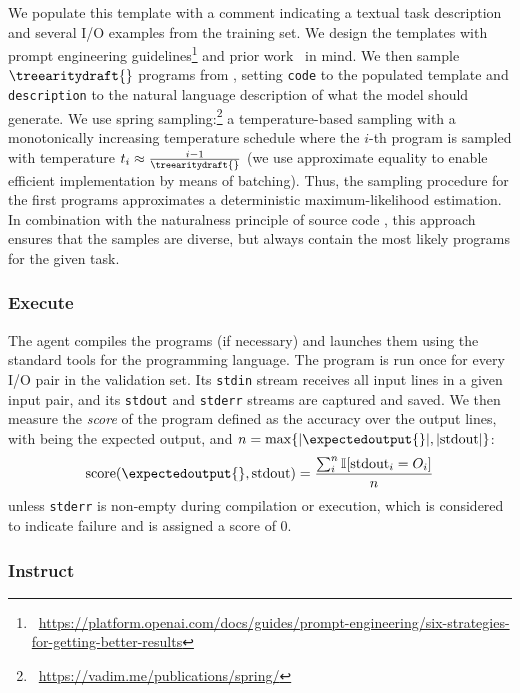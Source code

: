 We populate this template with a comment indicating a textual task description and several I/O examples from the training set.
We design the templates with prompt engineering guidelines\footnote{~\url{https://platform.openai.com/docs/guides/prompt-engineering/six-strategies-for-getting-better-results}} and prior work~\cite{debruin2021:autoencoders} in mind.
We then sample $\treearitydraft{}$ programs from \synthmodelnoargs{}, setting \texttt{code} to the populated template and \texttt{description} to the natural language description of what the model should generate.
We use spring sampling:\footnote{~\url{https://vadim.me/publications/spring/}} a temperature-based sampling with a monotonically increasing temperature schedule where the $i$-th program is sampled with temperature $t_i \approx \frac{i-1}{\treearitydraft{}}$ (we use approximate equality to enable efficient implementation by means of batching).
Thus, the sampling procedure for the first programs approximates a deterministic maximum-likelihood estimation.
In combination with the naturalness principle of source code \cite{allamanis2018:survey,jiang2022:bugs}, this approach ensures that the samples are diverse, but always contain the most likely programs for the given task.



\subsubsection{Execute}
\label{sec:execute}

The \execute{} agent compiles the programs (if necessary) and launches them using the standard tools for the programming language.
The program is run once for every I/O pair in the validation set. 
Its \texttt{stdin} stream receives all input lines in a given input pair, and its \texttt{stdout} and \texttt{stderr} streams are captured and saved.
We then measure the \emph{score} of the program defined as the accuracy over the output lines, with \expectedoutput{} being the expected output, and $n=\max\{|\expectedoutput{}|, |\text{stdout}|\}$:
\[    
\text{score}(\expectedoutput{}, \text{stdout}) = \frac{\sum^{n}_i{\mathbb{I}[\text{stdout}_i = O_i]}}{n} 
\]
unless \texttt{stderr} is non-empty during compilation or execution, which is considered to indicate failure and is assigned a score of 0.

\subsubsection{Instruct}
\label{sec:instruct}

